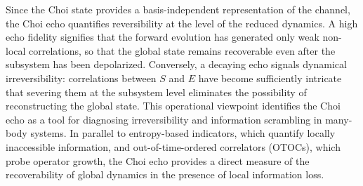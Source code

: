 \documentclass[pra,twocolumn,aps,showpacs,superscriptaddress,longbibliography]{revtex4-2}
\begin{document}


Since the Choi state provides a basis-independent representation of the channel, the Choi echo quantifies reversibility at the level of the reduced dynamics. A high echo fidelity signifies that the forward evolution has generated only weak non-local correlations, so that the global state remains recoverable even after the subsystem has been depolarized. Conversely, a decaying echo signals dynamical irreversibility: correlations between \(S\) and \(E\) have become sufficiently intricate that severing them at the subsystem level eliminates the possibility of reconstructing the global state. This operational viewpoint identifies the Choi echo as a tool for diagnosing irreversibility and information scrambling in many-body systems. In parallel to entropy-based indicators, which quantify locally inaccessible information, and out-of-time-ordered correlators (OTOCs), which probe operator growth, the Choi echo provides a direct measure of the recoverability of global dynamics in the presence of local information loss.

%
\end{document}
